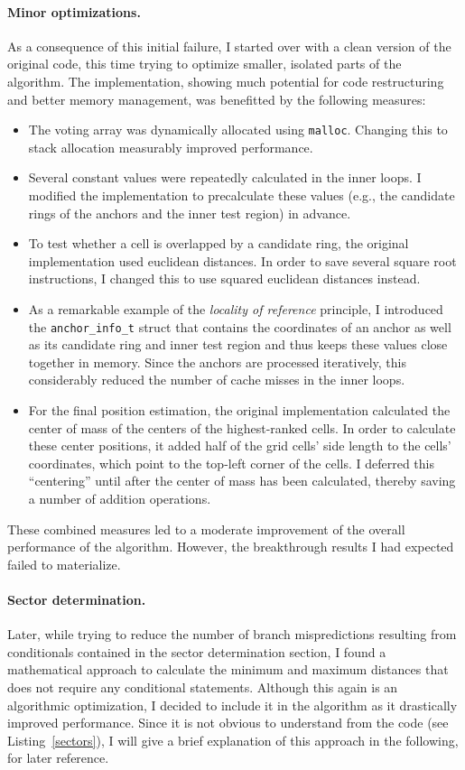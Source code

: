 \paragraph{Minor optimizations.}
As a consequence of this initial failure, I started over with a clean version of the original code, this time trying to optimize smaller, isolated parts of the algorithm. The implementation, showing much potential for code restructuring and better memory management, was benefitted by the following measures:
\begin{itemize}
\item The voting array was dynamically allocated using \texttt{malloc}. Changing this to stack allocation measurably improved performance.
\item Several constant values were repeatedly calculated in the inner loops. I modified the implementation to precalculate these values (e.g., the candidate rings of the anchors and the inner test region) in advance.
\item To test whether a cell is overlapped by a candidate ring, the original implementation used euclidean distances. In order to save several square root instructions, I changed this to use squared euclidean distances instead.
\item As a remarkable example of the \emph{locality of reference} principle, I introduced the \texttt{anchor\_info\_t} struct that contains the coordinates of an anchor as well as its candidate ring and inner test region and thus keeps these values close together in memory. Since the anchors are processed iteratively, this considerably reduced the number of cache misses in the inner loops.
\item For the final position estimation, the original implementation calculated the center of mass of the centers of the highest-ranked cells. In order to calculate these center positions, it added half of the grid cells' side length to the cells' coordinates, which point to the top-left corner of the cells. I deferred this ``centering'' until after the center of mass has been calculated, thereby saving a number of addition operations.
\end{itemize}
These combined measures led to a moderate improvement of the overall performance of the algorithm. However, the breakthrough results I had expected failed to materialize.

\paragraph{Sector determination.}
Later, while trying to reduce the number of branch mispredictions resulting from conditionals contained in the sector determination section, I found a mathematical approach to calculate the minimum and maximum distances that does not require any conditional statements. Although this again is an algorithmic optimization, I decided to include it in the algorithm as it drastically improved performance. Since it is not obvious to understand from the code (see Listing~\ref{sectors}), I will give a brief explanation of this approach in the following, for later reference.

